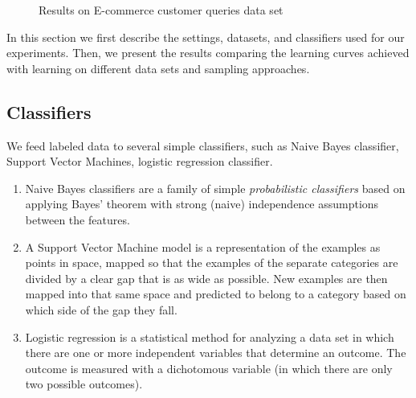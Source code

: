 \documentclass{acmtog}
\begin{document}
\begin{figure}
\centering%
\caption{Results on E-commerce customer queries data set}
\label{fig:ec}
\end{figure}
In this section we first describe the settings, datasets, and classifiers used for our experiments. Then, we present the results comparing the learning curves achieved with learning on different data sets and  sampling approaches.
\subsection{Classifiers}
We feed labeled data to several simple classifiers, such as Naive Bayes classifier, Support Vector Machines, logistic regression classifier.
\begin{enumerate}
    \item Naive Bayes classifiers are a family of simple \textit{probabilistic classifiers} based on applying Bayes' theorem with strong (naive) independence assumptions between the features.
    \item A Support Vector Machine model is a representation of the examples as points in space, mapped so that the examples of the separate categories are divided by a clear gap that is as wide as possible. New examples are then mapped into that same space and predicted to belong to a category based on which side of the gap they fall.
    \item Logistic regression is a statistical method for analyzing a data set in which there are one or more independent variables that determine an outcome. The outcome is measured with a dichotomous variable (in which there are only two possible outcomes).
\end{enumerate}
\end{document}
